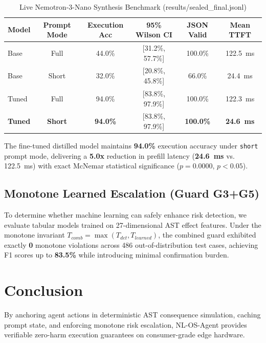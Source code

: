\documentclass[10pt,journal,compsoc]{IEEEtran}
\begin{document}
\begin{table}[htbp]
\caption{Live Nemotron-3-Nano Synthesis Benchmark (results/sealed_final.jsonl)}
\label{tab:e5_sealed}
\centering
\begin{tabular}{lccccc}
\toprule
Model & Prompt Mode & Execution Acc & 95\% Wilson CI & JSON Valid & Mean TTFT \\
\midrule
Base & Full & 44.0\% & [31.2\%, 57.7\%] & 100.0\% & 122.5~ms \\
Base & Short & 32.0\% & [20.8\%, 45.8\%] & 66.0\% & 24.4~ms \\
Tuned & Full & 94.0\% & [83.8\%, 97.9\%] & 100.0\% & 122.3~ms \\
\textbf{Tuned} & \textbf{Short} & \textbf{94.0\%} & [83.8\%, 97.9\%] & \textbf{100.0\%} & \textbf{24.6~ms} \\
\bottomrule
\end{tabular}
\end{table}

The fine-tuned distilled model maintains \textbf{94.0\%} execution accuracy under \texttt{short} prompt mode, delivering a \textbf{5.0x} reduction in prefill latency (\textbf{24.6~ms} vs. 122.5~ms) with exact McNemar statistical significance ($p = 0.0000$, $p < 0.05$).

\subsection{Monotone Learned Escalation (Guard G3+G5)}
To determine whether machine learning can safely enhance risk detection, we evaluate tabular models trained on 27-dimensional AST effect features. Under the monotone invariant $T_{comb} = \max(T_{det}, T_{learned})$, the combined guard exhibited exactly \textbf{0} monotone violations across 486 out-of-distribution test cases, achieving F1 scores up to \textbf{83.5\%} while introducing minimal confirmation burden.

\section{Conclusion}
By anchoring agent actions in deterministic AST consequence simulation, caching prompt state, and enforcing monotone risk escalation, NL-OS-Agent provides verifiable zero-harm execution guarantees on consumer-grade edge hardware.


\end{document}
